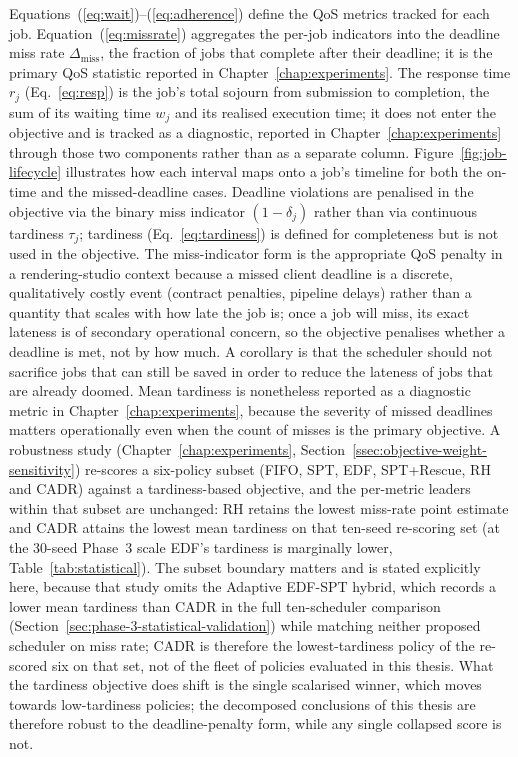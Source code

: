 Equations~(\ref{eq:wait})--(\ref{eq:adherence}) define the QoS metrics tracked for each job. Equation~(\ref{eq:missrate}) aggregates the per-job indicators into the deadline miss rate $\Delta_{\text{miss}}$, the fraction of jobs that complete after their deadline; it is the primary QoS statistic reported in Chapter~\ref{chap:experiments}. The response time $r_j$ (Eq.~\ref{eq:resp}) is the job's total sojourn from submission to completion, the sum of its waiting time $w_j$ and its realised execution time; it does not enter the objective and is tracked as a diagnostic, reported in Chapter~\ref{chap:experiments} through those two components rather than as a separate column. Figure~\ref{fig:job-lifecycle} illustrates how each interval maps onto a job's timeline for both the on-time and the missed-deadline cases. Deadline violations are penalised in the objective via the binary miss indicator $(1 - \delta_j)$ rather than via continuous tardiness $\tau_j$; tardiness (Eq.~\ref{eq:tardiness}) is defined for completeness but is not used in the objective. The miss-indicator form is the appropriate QoS penalty in a rendering-studio context because a missed client deadline is a discrete, qualitatively costly event (contract penalties, pipeline delays) rather than a quantity that scales with how late the job is; once a job will miss, its exact lateness is of secondary operational concern, so the objective penalises whether a deadline is met, not by how much. A corollary is that the scheduler should not sacrifice jobs that can still be saved in order to reduce the lateness of jobs that are already doomed. Mean tardiness is nonetheless reported as a diagnostic metric in Chapter~\ref{chap:experiments}, because the severity of missed deadlines matters operationally even when the count of misses is the primary objective. A robustness study (Chapter~\ref{chap:experiments}, Section~\ref{ssec:objective-weight-sensitivity}) re-scores a six-policy subset (FIFO, SPT, EDF, SPT+Rescue, RH and CADR) against a tardiness-based objective, and the per-metric leaders within that subset are unchanged: RH retains the lowest miss-rate point estimate and CADR attains the lowest mean tardiness on that ten-seed re-scoring set (at the 30-seed Phase~3 scale EDF's tardiness is marginally lower, Table~\ref{tab:statistical}). The subset boundary matters and is stated explicitly here, because that study omits the Adaptive EDF-SPT hybrid, which records a lower mean tardiness than CADR in the full ten-scheduler comparison (Section~\ref{sec:phase-3-statistical-validation}) while matching neither proposed scheduler on miss rate; CADR is therefore the lowest-tardiness policy of the re-scored six on that set, not of the fleet of policies evaluated in this thesis. What the tardiness objective does shift is the single scalarised winner, which moves towards low-tardiness policies; the decomposed conclusions of this thesis are therefore robust to the deadline-penalty form, while any single collapsed score is not.

